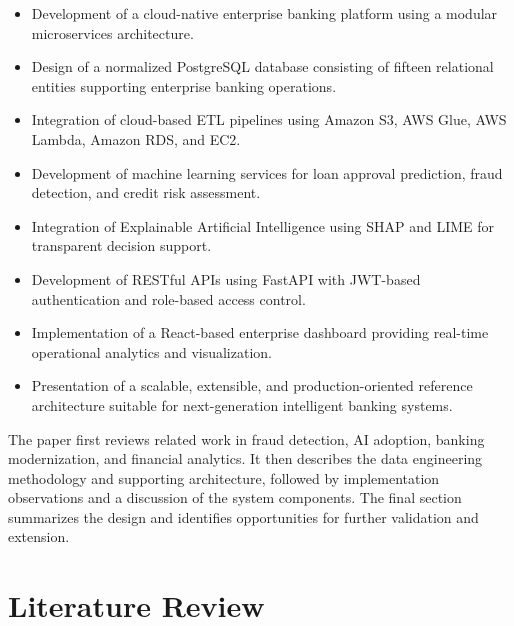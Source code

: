\documentclass[conference]{IEEEtran}
\begin{document}
\begin{itemize}

\item Development of a cloud-native enterprise banking platform using a modular microservices architecture.

\item Design of a normalized PostgreSQL database consisting of fifteen relational entities supporting enterprise banking operations.

\item Integration of cloud-based ETL pipelines using Amazon S3, AWS Glue, AWS Lambda, Amazon RDS, and EC2.

\item Development of machine learning services for loan approval prediction, fraud detection, and credit risk assessment.

\item Integration of Explainable Artificial Intelligence using SHAP and LIME for transparent decision support.

\item Development of RESTful APIs using FastAPI with JWT-based authentication and role-based access control.

\item Implementation of a React-based enterprise dashboard providing real-time operational analytics and visualization.

\item Presentation of a scalable, extensible, and production-oriented reference architecture suitable for next-generation intelligent banking systems.

\end{itemize}

The paper first reviews related work in fraud detection, AI adoption, banking modernization, and financial analytics. It then describes the data engineering methodology and supporting architecture, followed by implementation observations and a discussion of the system components. The final section summarizes the design and identifies opportunities for further validation and extension.
\section{Literature Review}

\end{document}
